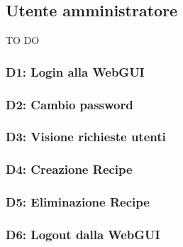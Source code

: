\pagebreak

\subsection{Utente amministratore} TO DO

\subsubsection{D1: Login alla WebGUI}
\subsubsection{D2: Cambio password}
\subsubsection{D3: Visione richieste utenti}
\subsubsection{D4: Creazione Recipe}
\subsubsection{D5: Eliminazione Recipe}
\subsubsection{D6: Logout dalla WebGUI}



